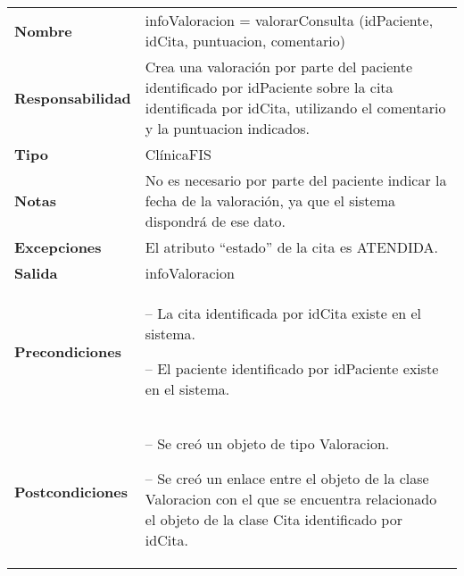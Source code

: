  \begin{table}[H]
  \centering
  \begin{tabularx}{\textwidth}{l|X}
    \textbf{Nombre}        &  infoValoracion = valorarConsulta (idPaciente,
    idCita, puntuacion, comentario) \\ 
    \textbf{Responsabilidad}  & Crea una valoración por parte del paciente
    identificado por idPaciente sobre la cita identificada por idCita,
    utilizando el comentario y la puntuacion indicados.  \\ 
    \textbf{Tipo}        &  ClínicaFIS \\ 
    \textbf{Notas}        & No es necesario por parte del paciente indicar la
    fecha de la valoración, ya que el sistema dispondrá de ese dato. \\
    \textbf{Excepciones}    & El atributo ``estado'' de la cita es ATENDIDA.\\
    \textbf{Salida}        & infoValoracion\\ 
    \textbf{Precondiciones}    &
    \begin{itemizenomargins}
    \item[--] La cita identificada por idCita existe en el sistema.
    \item[--] El paciente identificado por idPaciente existe en el sistema.
    \end{itemizenomargins} \\ 
    \textbf{Postcondiciones}  &
    \begin{itemizenomargins}
    \item[--] Se creó un objeto de tipo Valoracion.
    \item[--] Se creó un enlace entre el objeto de la clase Valoracion con el que
      se encuentra relacionado el objeto de la clase Cita identificado por
      idCita.
      
    \end{itemizenomargins}

  \end{tabularx}
\end{table}
